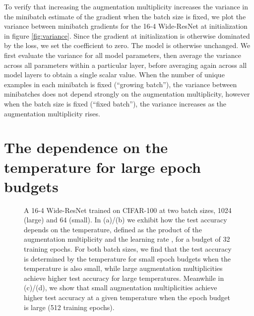 \documentclass{article}
\begin{document}
To verify that increasing the augmentation multiplicity increases the variance in the minibatch estimate of the gradient when the batch size is fixed, we plot the variance between minibatch gradients for the 16-4 Wide-ResNet at initialization in figure \ref{fig:variance}. Since the gradient at initialization is otherwise dominated by the  loss, we set the  coefficient to zero. The model is otherwise unchanged. We first evaluate the variance for all model parameters, then average the variance across all parameters within a particular layer, before averaging again across all model layers to obtain a single scalar value. When the number of unique examples in each minibatch is fixed (``growing batch''), the variance between minibatches does not depend strongly on the augmentation multiplicity, however when the batch size is fixed (``fixed batch''), the variance increases as the augmentation multiplicity rises.

\section{The dependence on the temperature for large epoch budgets}
\label{app:large_budget_temp}

\begin{figure}[h]
\centering
{}

\caption{A 16-4 Wide-ResNet trained on CIFAR-100 at two batch sizes, 1024 (large) and 64 (small). In (a)/(b) we exhibit how the test accuracy depends on the temperature, defined as the product of the augmentation multiplicity  and the learning rate , for a budget of 32 training epochs. For both batch sizes, we find that the test accuracy is determined by the temperature for small epoch budgets when the temperature is also small, while large augmentation multiplicities achieve higher test accuracy for large temperatures. Meanwhile in (c)/(d), we show that small augmentation multiplicities achieve higher test accuracy at a given temperature when the epoch budget is large (512 training epochs).
}
\label{fig:large_epoch}
\end{figure}
\end{document}
